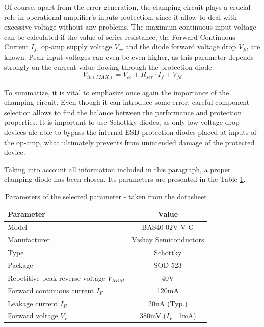 \documentclass[12pt,a4paper]{article}
\begin{document}
Of course, apart from the error generation, the clamping circuit plays a crucial role in operational amplifier's inputs protection, since it allow to deal with excessive voltage without any problems. The maximum continuous input voltage can be calculated if the value of series resistance, the Forward Continuous Current $I_f$, op-amp supply voltage $V_{cc}$ and the diode forward voltage drop $V_{fd}$ are known. Peak input voltages can even be even higher, as this parameter depends strongly on the current value flowing through the protection diode.
\begin{equation}
    V_{in(MAX)} = V_{cc} + R_{ser} \cdot I_f + V_{fd}
    \label{maxvolt}
\end{equation}
\par 
To summarize, it is vital to emphasize once again the importance of the champing circuit. Even though it can introduce some error, careful component selection allows to find the balance between the performance and protection properties. It is important to use Schottky diodes, as only low voltage drop devices ale able to bypass the internal ESD protection diodes placed at inputs of the op-amp, what ultimately prevents from unintended damage of the protected device.
\par
Taking into account all information included in this paragraph, a proper clamping diode has been chosen. Its parameters are presented in the Table \ref{tab:bas40_params}.

\begin{table}[ht!]
\begin{tabular}{|l|c|}
\hline
\textbf{Parameter}		& \textbf{Value} 	\\ \hline
Model  			& BAS40-02V-V-G         	\\ \hline
Manufacturer    & Vishay Semiconductors	\\ \hline
Type           	& Schottky  			\\ \hline
Package &  SOD-523		\\ \hline
Repetitive peak reverse voltage $V_{RRM}$ &  40V \\ \hline
Forward continuous current $I_{F}$ &  120mA \\ \hline
Leakage current $I_{R}$ &  20nA (Typ.) \\ \hline
Forward voltage $V_{F}$ &  380mV ($I_F$=1mA) \\ \hline
\end{tabular}
\caption{Parameters of the selected parameter - taken from the datasheet \cite{bas40_params}}
\label{tab:bas40_params}
\end{table}
\end{document}
